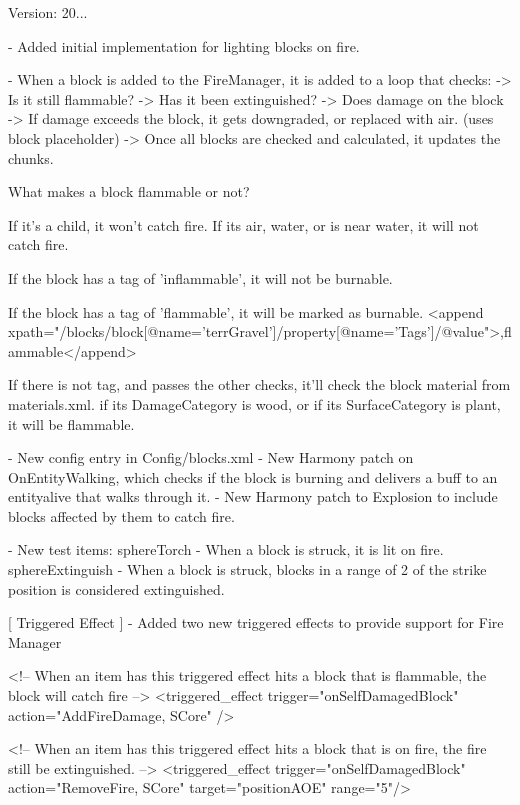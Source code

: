 Version\+: 20... \begin{DoxyVerb}
    - Added initial implementation for lighting blocks on fire.

        - When a block is added to the FireManager, it is added to a loop that checks:
            -> Is it still flammable?
            -> Has it been extinguished?
            -> Does damage on the block
            -> If damage exceeds the block, it gets downgraded, or replaced with air. (uses block placeholder)
            -> Once all blocks are checked and calculated, it updates the chunks.

    What makes a block flammable or not?

        If it's a child, it won't catch fire. If its air, water, or is near water, it will not catch fire.      

        If the block has a tag of 'inflammable', it will not be burnable.

        If the block has a tag of 'flammable', it will be marked as burnable. 
            <append xpath="/blocks/block[@name='terrGravel']/property[@name='Tags']/@value">,flammable</append>

        If there is not tag, and passes the other checks, it'll check the block material from materials.xml.
            if its DamageCategory is wood, or if its SurfaceCategory is plant, it will be flammable.

    - New config entry in Config/blocks.xml
    - New Harmony patch on OnEntityWalking, which checks if the block is burning and delivers a buff to an entityalive that walks through it.
    - New Harmony patch to Explosion to include blocks affected by them to catch fire.

    - New test items:
        sphereTorch - When a block is struck, it is lit on fire.
        sphereExtinguish - When a block is struck, blocks in a range of 2 of the strike position is considered extinguished.

[ Triggered Effect ]
    - Added two new triggered effects to provide support for Fire Manager

        <!-- When an item has this triggered effect hits a block that is flammable, the block will catch fire -->
        <triggered_effect trigger="onSelfDamagedBlock" action="AddFireDamage, SCore" />

        <!-- When an item has this triggered effect hits a block that is on fire, the fire still be extinguished. -->
        <triggered_effect trigger="onSelfDamagedBlock" action="RemoveFire, SCore" target="positionAOE" range="5"/>
\end{DoxyVerb}


